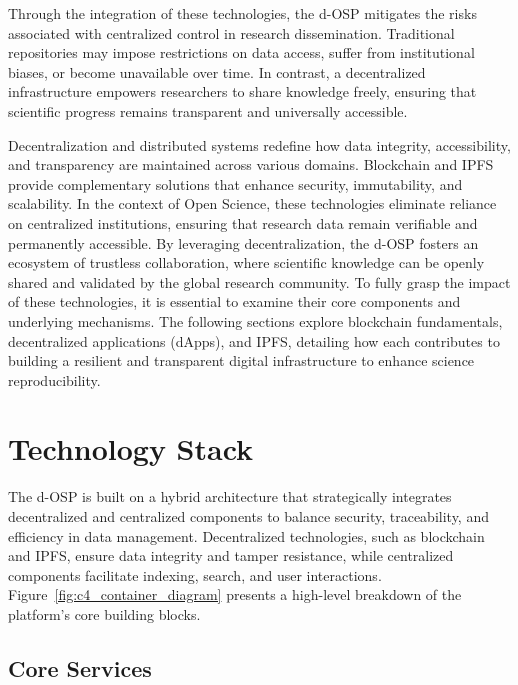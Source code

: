 \documentclass[final]{rc-book-2.14}
\begin{document}
Through the integration of these technologies, the d-OSP mitigates the risks associated with centralized control in research dissemination. Traditional repositories may impose restrictions on data access, suffer from institutional biases, or become unavailable over time. In contrast, a decentralized infrastructure empowers researchers to share knowledge freely, ensuring that scientific progress remains transparent and universally accessible.

Decentralization and distributed systems redefine how data integrity, accessibility, and transparency are maintained across various domains. Blockchain and IPFS provide complementary solutions that enhance security, immutability, and scalability. In the context of Open Science, these technologies eliminate reliance on centralized institutions, ensuring that research data remain verifiable and permanently accessible. By leveraging decentralization, the d-OSP fosters an ecosystem of trustless collaboration, where scientific knowledge can be openly shared and validated by the global research community. To fully grasp the impact of these technologies, it is essential to examine their core components and underlying mechanisms. The following sections explore blockchain fundamentals, decentralized applications (dApps), and IPFS, detailing how each contributes to building a resilient and transparent digital infrastructure to enhance science reproducibility.

\section{Technology Stack}
\label{chp:proposed_model:sec:tech_stack}

The d-OSP is built on a hybrid architecture that strategically integrates decentralized and centralized components to balance security, traceability, and efficiency in data management. Decentralized technologies, such as blockchain and IPFS, ensure data integrity and tamper resistance, while centralized components facilitate indexing, search, and user interactions. Figure~\ref{fig:c4_container_diagram} presents a high-level breakdown of the platform's core building blocks.

\subsection{Core Services}
\end{document}

